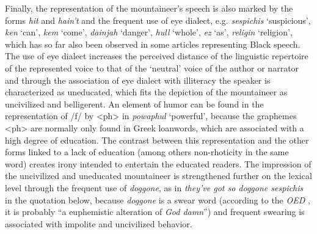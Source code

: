 Finally, the representation of the mountaineer’s speech is also marked by the forms \emph{hit} and \emph{hain’t} and the frequent use of eye dialect, e.g. \emph{sespichis} ‘suspicious’, \emph{ken} ‘can’, \emph{kem} ‘come’, \emph{dainjah} ‘danger’, \emph{hull} ‘whole’, \emph{ez} ‘as’, \emph{religin} ‘religion’, which has so far also been observed in some articles representing Black speech. The use of eye dialect increases the perceived distance of the linguistic repertoire of the represented voice to that of the ‘neutral’ voice of the author or narrator and through the association of eye dialect with illiteracy the speaker is characterized as uneducated, which fits the depiction of the mountaineer as uncivilized and belligerent. An element of humor can be found in the representation of /f/ by <ph> in \emph{powaphul} ‘powerful’, because the graphemes <ph> are normally only found in Greek loanwords, which are associated with a high degree of education. The contrast between this representation and the other forms linked to a lack of education (among others non-rhoticity in the same word) creates irony intended to entertain the educated readers. The impression of the uncivilized and uneducated mountaineer is strengthened further on the lexical level through the frequent use of \emph{doggone}, as in \emph{they’ve got so doggone sespichis} in the quotation below, because \emph{doggone} is a swear word (according to the \emph{OED} \citeyear{doggone}, it is probably “a euphemistic alteration of \emph{God damn}”) and frequent swearing is associated with impolite and uncivilized behavior.

